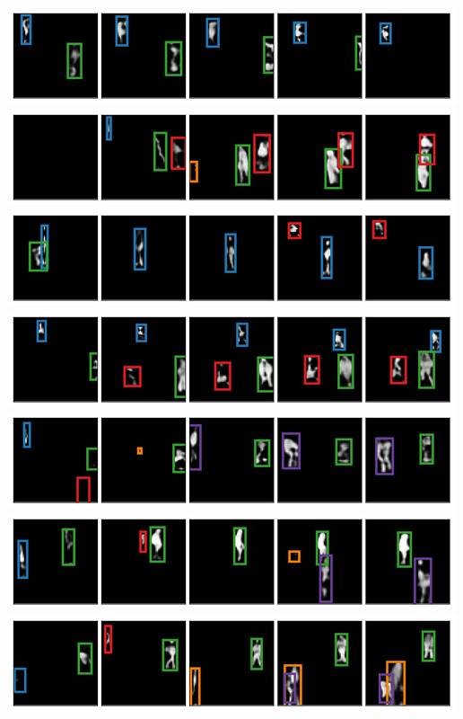 \begin{center}
    \begin{minipage}[c]{0.49\linewidth}
        \centering
         \includegraphics[width=\linewidth]{figures/SQAIR/duke_sample/000078.png}
        \includegraphics[width=\linewidth]{figures/SQAIR/duke_sample/000250.png}
        \includegraphics[width=\linewidth]{figures/SQAIR/duke_sample/000005.png}
        \includegraphics[width=\linewidth]{figures/SQAIR/duke_sample/000015.png}
        \includegraphics[width=\linewidth]{figures/SQAIR/duke_sample/000019.png}
        \includegraphics[width=\linewidth]{figures/SQAIR/duke_sample/000023.png}
        \includegraphics[width=\linewidth]{figures/SQAIR/duke_sample/000038.png}

\end{minipage}
\end{center}
